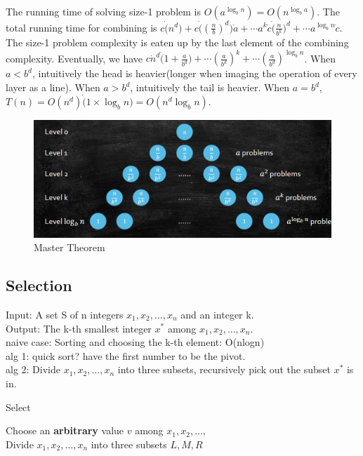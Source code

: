 \begin{prf}
The running time of solving size-1 problem is $O(a^{\log_bn})=O(n^{\log_ba})$.
The total running time for combining is $c\dot (n^d)+c\dot ((\frac{n}{b})^d)\dot a+\cdots a^k\dot c \dot (\frac{n}{b^k})^d+\cdots a^{\log_bn}\dot c$.
The size-1 problem complexity is eaten up by the last element of the combining complexity. 
Eventually, we have $c\dot n^d \dot (1+\frac{a}{b^d})+\cdots(\frac{a}{b^d})^k+\cdots(\frac{a}{b^d})^{\log_bn}$.
When $a<b^d$, intuitively the head is heavier(longer when imaging the operation of every layer as a line).
When $a>b^d$, intuitively the tail is heavier.
When $a=b^d$, $T(n)=O(n^d)\dot(1\times \log_bn)=O(n^d\log_bn)$.

\end{prf}

\begin{figure}
    \centering
    \includegraphics[width=0.8\linewidth]{Notes/fig/Master Theorem.png}
    \caption{Master Theorem}
    \label{fig:MasterTheorem}
\end{figure}




\subsection{Selection}
Input: A set S of n integers $x_1, x_2, \ldots , x_{n}$ and an integer k.\\
Output: The k-th smallest integer $x^*$ among $x_1, x_2, \ldots , x_{n}$.\\
naive case: Sorting and choosing the k-th element: O(nlogn)\\
alg 1: quick sort? have the first number to be the pivot.\\
alg 2: Divide $x_1,x_2,\ldots,x_n$ into three subsets, recursively pick out the subset $x^*$ is in.\\
\begin{algorithm}
    \caption{Select}
    Choose an \textbf{arbitrary} value $v$ among $x_1,x_2,\ldots,$\\
    Divide $x_1,x_2,\ldots,x_n$ into three subsets $L,M,R$\\
\end{algorithm}

